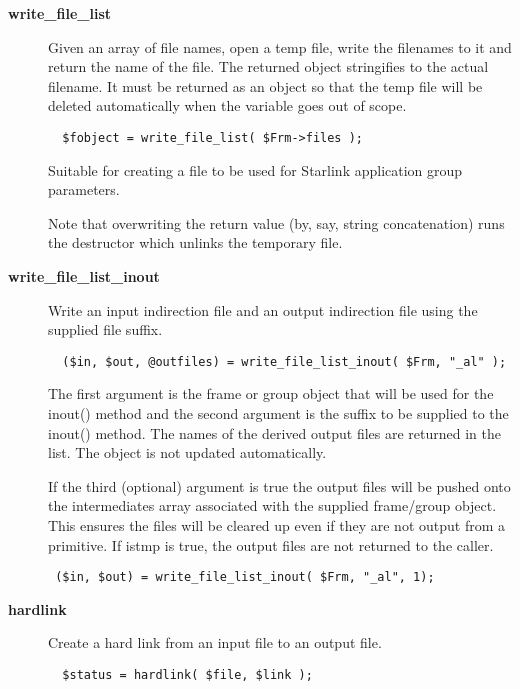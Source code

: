 \begin{description}
\begin{description}
\begin{description}
\item[{\textbf{write\_file\_list}}] \mbox{}

Given an array of file names, open a temp file, write the filenames
to it and return the name of the file. The returned object stringifies
to the actual filename. It must be returned as an object so that
the temp file will be deleted automatically when the variable
goes out of scope.

\begin{verbatim}
  $fobject = write_file_list( $Frm->files );
\end{verbatim}


Suitable for creating a file to be used for Starlink application
group parameters.



Note that overwriting the return value (by, say, string concatenation)
runs the destructor which unlinks the temporary file.


\item[{\textbf{write\_file\_list\_inout}}] \mbox{}

Write an input indirection file and an output indirection file using the
supplied file suffix.

\begin{verbatim}
  ($in, $out, @outfiles) = write_file_list_inout( $Frm, "_al" );
\end{verbatim}


The first argument is the frame or group object that will be used
for the inout() method and the second argument is the suffix to
be supplied to the inout() method. The names of the derived output files
are returned in the list. The object is not updated automatically.



If the third (optional) argument
is true the output files will be pushed onto the intermediates
array associated with the supplied frame/group object. This ensures
the files will be cleared up even if they are not output from a
primitive. If istmp is true, the output files are not returned to
the caller.

\begin{verbatim}
 ($in, $out) = write_file_list_inout( $Frm, "_al", 1);
\end{verbatim}

\item[{\textbf{hardlink}}] \mbox{}

Create a hard link from an input file to an output file.

\begin{verbatim}
  $status = hardlink( $file, $link );
\end{verbatim}



\end{description}
\end{description}
\end{description}
